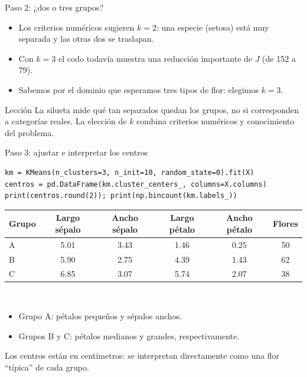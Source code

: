\begin{frame}{Paso 2: ¿dos o tres grupos?}
  \begin{itemize}
    \item Los criterios numéricos sugieren $k=2$: una especie (setosa) está muy separada
          y las otras dos se traslapan.
    \item Con $k=3$ el codo todavía muestra una reducción importante de $J$ (de 152 a 79).
    \item Sabemos por el dominio que esperamos tres tipos de flor: elegimos $k=3$.
  \end{itemize}
  \vspace{6pt}
  \begin{alertblock}{Lección}
    La silueta mide qué tan separados quedan los grupos, no si corresponden a categorías reales.
    La elección de $k$ combina criterios numéricos y conocimiento del problema.
  \end{alertblock}
\end{frame}

\begin{frame}[fragile]{Paso 3: ajustar e interpretar los centros}
\begin{lstlisting}
km = KMeans(n_clusters=3, n_init=10, random_state=0).fit(X)
centros = pd.DataFrame(km.cluster_centers_, columns=X.columns)
print(centros.round(2)); print(np.bincount(km.labels_))
\end{lstlisting}
  \vspace{2pt}
  \centering
  \small
  \begin{tabular}{@{}lccccc@{}}
    \toprule
    \textbf{Grupo} & \textbf{Largo sépalo} & \textbf{Ancho sépalo} & \textbf{Largo pétalo} & \textbf{Ancho pétalo} & \textbf{Flores}\\
    \midrule
    A & 5.01 & 3.43 & 1.46 & 0.25 & 50 \\
    B & 5.90 & 2.75 & 4.39 & 1.43 & 62 \\
    C & 6.85 & 3.07 & 5.74 & 2.07 & 38 \\
    \bottomrule
  \end{tabular}\\[6pt]
  \raggedright
  \begin{itemize}
    \item Grupo A: pétalos pequeños y sépalos anchos.
    \item Grupos B y C: pétalos medianos y grandes, respectivamente.
  \end{itemize}
  {\small Los centros están en centímetros: se interpretan directamente como una flor ``típica'' de cada grupo.}
\end{frame}

